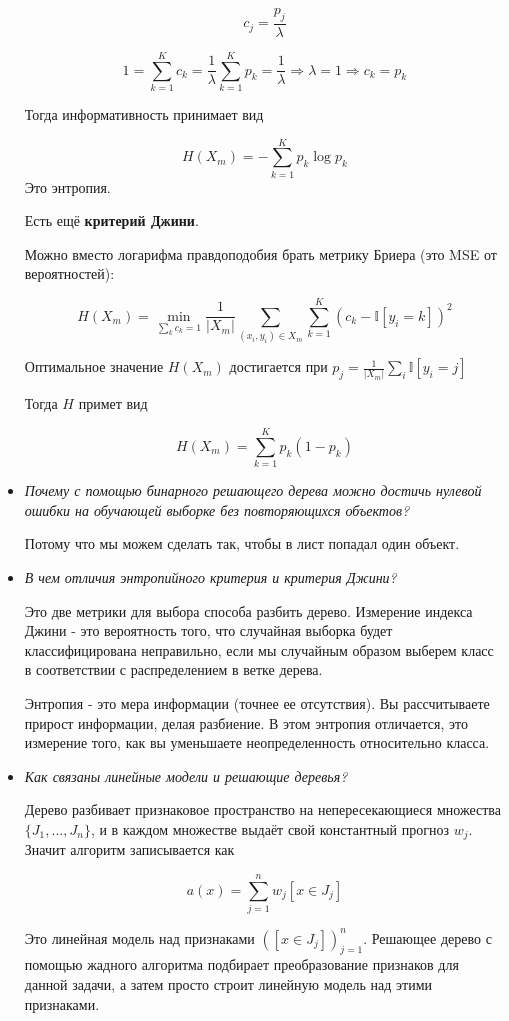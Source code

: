 \documentclass[a4paper]{article}
\begin{document}
\begin{itemize}
\[ c_j = \frac{p_j}{\lambda} \]

\[ 1 = \sum_{k=1}^K c_k = \frac{1}{\lambda} \sum_{k=1}^K p_k = \frac{1}{\lambda} \Rightarrow \lambda = 1 \Rightarrow c_k = p_k \]

Тогда информативность принимает вид 

\[ H(X_m) = - \sum_{k=1}^K p_k \log p_k \]
Это энтропия.

Есть ещё \textbf{критерий Джини}.

Можно вместо логарифма правдоподобия брать метрику Бриера (это MSE от вероятностей):

\[ H(X_m) = \min_{\sum_k c_k = 1} \frac{1}{|X_m|} \sum_{(x_i, y_i) \in X_m} \sum_{k=1}^K ( c_k - \mathbb{I}[y_i=k] )^2 \]

Оптимальное значение $H(X_m)$ достигается при $p_j = \frac{1}{|X_m|} \sum_i \mathbb{I} [y_i = j]$

Тогда $H$ примет вид 

\[ H(X_m) = \sum_{k=1}^K p_k (1-p_k) \]

\item \textit{Почему с помощью бинарного решающего дерева можно достичь нулевой ошибки на обучающей выборке без повторяющихся объектов?}

Потому что мы можем сделать так, чтобы в лист попадал один объект.

\item \textit{В чем отличия энтропийного критерия и критерия Джини?}

Это две метрики для выбора способа разбить дерево. Измерение индекса Джини - это вероятность того, что случайная выборка будет классифицирована неправильно, если мы случайным образом выберем класс в соответствии с распределением в ветке дерева.

Энтропия - это мера информации (точнее ее отсутствия). Вы рассчитываете прирост информации, делая разбиение. В этом энтропия отличается, это измерение того, как вы уменьшаете неопределенность относительно класса.


\item \textit{Как связаны линейные модели и решающие деревья?}

Дерево разбивает признаковое пространство на непересекающиеся множества $\{ J_1, ..., J_n \}$,  и в каждом множестве выдаёт свой константный прогноз $w_j$. Значит алгоритм записывается как 

\[ a(x) = \sum_{j=1}^n w_j [x \in J_j] \]

Это линейная модель над признаками $([x \in J_j])_{j=1}^n$. Решающее
дерево с помощью жадного алгоритма подбирает преобразование признаков для данной задачи, а затем просто строит линейную модель над этими признаками.


\end{itemize}
\end{document}
